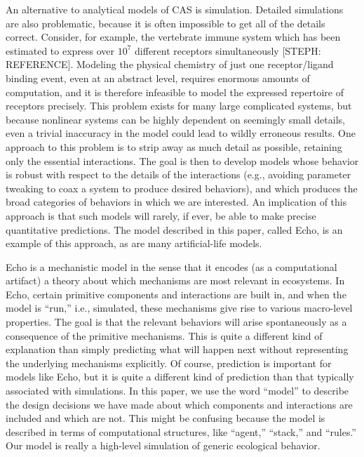 An alternative to analytical models of CAS is simulation.  Detailed
simulations are also problematic, because it is often impossible to get
all of the details correct.  Consider, for example, the vertebrate
immune system which has been estimated to express over $10^7$
different receptors simultaneously [STEPH: REFERENCE].  Modeling the
physical chemistry of just one receptor/ligand binding event, even at
an abstract level, requires enormous amounts of computation, and it is
therefore infeasible to model the expressed repertoire of receptors
precisely.  This problem exists for many large complicated systems,
but because nonlinear systems can be highly dependent on seemingly
small details, even a trivial inaccuracy in the model could lead to
wildly erroneous results.  One approach to this problem is to strip
away as much detail as possible, retaining only the essential
interactions.  The goal is then to develop models whose behavior is
robust with respect to the details of the interactions (e.g., avoiding
parameter tweaking to coax a system to produce desired behaviors), and
which produces the broad categories of behaviors in which we are
interested.  An implication of this approach is that such models will
rarely, if ever, be able to make precise quantitative predictions.
The model described in this paper, called Echo, is an example of this
approach, as are many artificial-life models.

Echo is a mechanistic model in the sense that it encodes (as a
computational artifact) a theory about which mechanisms are most
relevant in ecosystems.  In Echo, certain primitive components and
interactions are built in, and when the model is ``run,'' i.e.,
simulated, these mechanisms give rise to various macro-level
properties.  The goal is that the relevant behaviors will arise
spontaneously as a consequence of the primitive mechanisms.  This is
quite a different kind of explanation than simply predicting what will
happen next without representing the underlying mechanisms explicitly.
Of course, prediction is important for models like Echo, but it is
quite a different kind of prediction than that typically associated
with simulations.  In this paper, we use the word ``model'' to
describe the design decisions we have made about which components and
interactions are included and which are not.  This might be confusing
because the model is described in terms of computational structures,
like ``agent,'' ``stack,'' and ``rules.''  Our model is really a
high-level simulation of generic ecological behavior.

